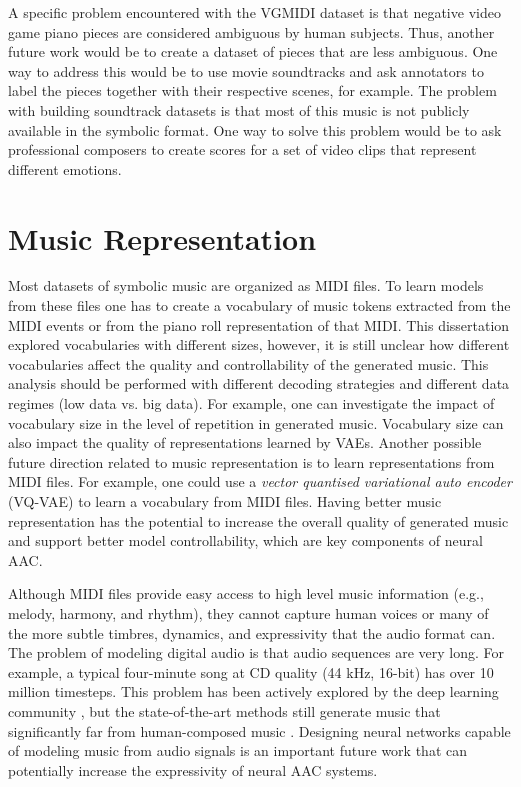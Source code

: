 A specific problem encountered with the VGMIDI dataset is that negative video game piano pieces are considered  ambiguous by human subjects. Thus, another future work would be to create a dataset of pieces that are less ambiguous. One way to address this would be to use movie soundtracks and ask annotators to label the pieces together with their respective scenes, for example. The problem with building soundtrack datasets is that most of this music is not publicly available in the symbolic format. One way to solve this problem would be to ask professional composers to create scores for a set of video clips that represent different emotions.

\section{Music Representation}

Most datasets of symbolic music are organized as MIDI files. To learn models from these files one has to create a vocabulary of music tokens extracted from the MIDI events or from the piano roll representation of that MIDI. This dissertation explored vocabularies with different sizes, however, it is still unclear how different vocabularies affect the quality and controllability of the generated music. This analysis should be performed with different decoding strategies and different data regimes (low data vs. big data). For example, one can investigate the impact of vocabulary size in the level of repetition in generated music. Vocabulary size can also impact the quality of representations learned by VAEs. Another possible future direction related to music representation is to learn representations from MIDI files. For example, one could use a \textit{vector quantised variational auto encoder} (VQ-VAE) to learn a vocabulary from MIDI files.  Having better music representation has the potential to increase the overall quality of generated music and support better model controllability, which are key components of neural AAC.

Although MIDI files provide easy access to high level music information (e.g., melody, harmony, and rhythm), they cannot capture human voices or many of the more subtle timbres, dynamics, and expressivity that the audio format can. The problem of modeling digital audio is that audio sequences are very long. For example, a typical four-minute song at CD quality (44 kHz, 16-bit) has over 10 million timesteps. This problem has been actively explored by the deep learning community \cite{oord2016wavenet, mehri2016samplernn, yamamoto2020parallel}, but the state-of-the-art methods still generate music that significantly far from human-composed music \cite{dhariwal2020jukebox}. Designing neural networks capable of modeling music from audio signals is an important future work that can potentially increase the expressivity of neural AAC systems.

